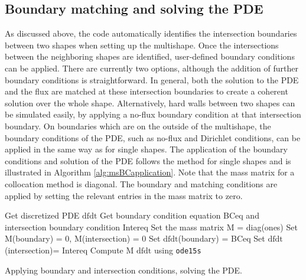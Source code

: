 \documentclass[11pt, a4paper]{article}
\theoremstyle{definition}
\begin{document}
\subsection{Boundary matching and solving the PDE}
As discussed above, the code automatically identifies the intersection boundaries between two shapes when setting up the multishape. Once the intersections between the neighboring shapes are identified, user-defined boundary conditions can be applied. There are currently two options, although the addition of further boundary conditions is straightforward. In general, both the solution to the PDE and the flux are matched at these intersection boundaries to create a coherent solution over the whole shape. Alternatively, hard walls between two shapes can be simulated easily, by applying a no-flux boundary condition at that intersection boundary. On boundaries which are on the outside of the multishape, the boundary conditions of the PDE, such as no-flux and Dirichlet conditions, can be applied in the same way as for single shapes.
The application of the boundary conditions and solution of the PDE follows the method for single shapes and is illustrated in Algorithm \ref{alg:msBCapplication}. Note that the mass matrix for a collocation method is diagonal. The boundary and matching conditions are applied by setting the relevant entries in the mass matrix to zero.
\\
	\begin{algorithm}[H]
		\SetAlgoLined
		Get discretized PDE $\text{dfdt}$\;
		Get boundary condition equation BCeq and intersection boundary condition Intereq\;
		Set the mass matrix M = diag(ones)\;
		Set M(boundary) = 0,  M(intersection) = 0\;
		Set $\text{dfdt}$(boundary) = BCeq\;
		Set $\text{dfdt}$(intersection)= Intereq\;
		Compute M $\text{dfdt}$ using \texttt{ode15s}\;
		\caption{Applying boundary and intersection conditions, solving the PDE.}
		\label{alg:msBCapplication}
	\end{algorithm}
	
	\pagebreak	
	
	
	
\end{document}
